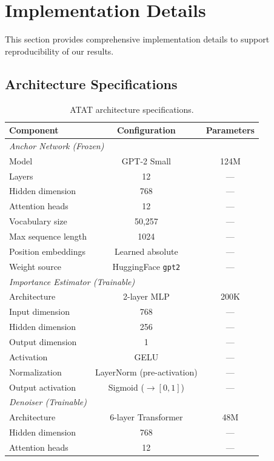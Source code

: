 \section{Implementation Details}
\label{app:implementation}

This section provides comprehensive implementation details to support reproducibility of our results.

\subsection{Architecture Specifications}

\begin{table}[H]
\centering
\caption{ATAT architecture specifications.}
\label{tab:arch-specs}
\begin{tabular}{lcc}
\toprule
\textbf{Component} & \textbf{Configuration} & \textbf{Parameters} \\
\midrule
\multicolumn{3}{l}{\textit{Anchor Network (Frozen)}} \\
Model & GPT-2 Small & 124M \\
Layers & 12 & --- \\
Hidden dimension & 768 & --- \\
Attention heads & 12 & --- \\
Vocabulary size & 50,257 & --- \\
Max sequence length & 1024 & --- \\
Position embeddings & Learned absolute & --- \\
Weight source & HuggingFace \texttt{gpt2} & --- \\
\midrule
\multicolumn{3}{l}{\textit{Importance Estimator (Trainable)}} \\
Architecture & 2-layer MLP & 200K \\
Input dimension & 768 & --- \\
Hidden dimension & 256 & --- \\
Output dimension & 1 & --- \\
Activation & GELU & --- \\
Normalization & LayerNorm (pre-activation) & --- \\
Output activation & Sigmoid ($\to [0,1]$) & --- \\
\midrule
\multicolumn{3}{l}{\textit{Denoiser (Trainable)}} \\
Architecture & 6-layer Transformer & 48M \\
Hidden dimension & 768 & --- \\
Attention heads & 12 & --- \\

\end{tabular}
\end{table}
